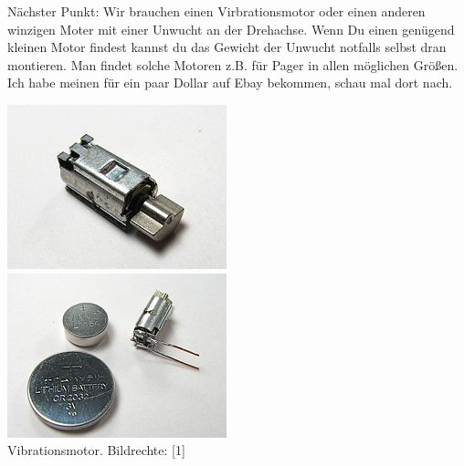 Nächster Punkt: Wir brauchen einen Virbrationsmotor oder einen anderen winzigen Moter mit einer Unwucht an der Drehachse. Wenn Du einen genügend kleinen Motor findest kannst du das Gewicht der Unwucht notfalls selbst dran montieren. Man findet solche Motoren z.B. für Pager in allen möglichen Größen. Ich habe meinen für ein paar Dollar auf Ebay bekommen, schau mal dort nach.
\\
\begin{center}
\includegraphics[width=\linewidth]{bristlebot/bristlebot6.jpg}\\
\includegraphics[width=\linewidth]{bristlebot/bristlebot7.jpg}\\
\footnotesize{Vibrationsmotor. Bildrechte: [1]}
\end{center}

